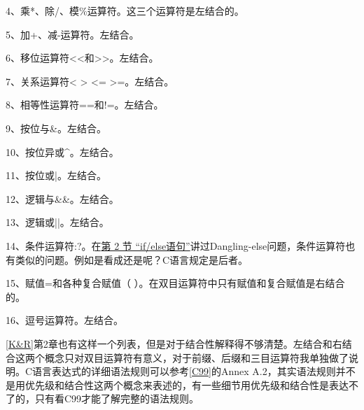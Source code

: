 4、乘*、除/、模\%运算符。这三个运算符是左结合的。



5、加+、减-运算符。左结合。



6、移位运算符\textless{}\textless{}和\textgreater{}\textgreater{}。左结合。



7、关系运算符\textless{} \textgreater{} \textless{}= \textgreater{}=。左结合。



8、相等性运算符==和!=。左结合。



9、按位与\&。左结合。



10、按位异或\textasciicircum{}。左结合。



11、按位或|。左结合。



12、逻辑与\&\&。左结合。



13、逻辑或||。左结合。



14、条件运算符:?。在\hyperlink{db.ch04s02.id2718511}{第 2 节 “if/\BookSplit{}else语句”}讲过Dangling-else问题，条件运算符也有类似的问题。例如是看成还是呢？C语言规定是后者。



15、赋值=和各种复合赋值（\BookCode{*=\BookSplit{}} \BookCode{/\BookSplit{}=\BookSplit{}} \BookCode{\%=\BookSplit{}} \BookCode{+\BookSplit{}=\BookSplit{}} \BookCode{-\BookSplit{}=\BookSplit{}} \BookCode{\textless{}\textless{}=\BookSplit{}} \BookCode{\textgreater{}\textgreater{}=\BookSplit{}} \BookCode{\&=\BookSplit{}} \BookCode{\textasciicircum{}=\BookSplit{}} \BookCode{|\BookSplit{}=\BookSplit{}}）。在双目运算符中只有赋值和复合赋值是右结合的。



16、逗号运算符。左结合。



\hyperlink{db.bi01.bibli.kr}{[K\&R]}第2章也有这样一个列表，但是对于结合性解释得不够清楚。左结合和右结合这两个概念只对双目运算符有意义，对于前缀、后缀和三目运算符我单独做了说明。C语言表达式的详细语法规则可以参考\hyperlink{db.bi01.bibli.c99}{[C99]}的Annex A.\BookSplit{}2，其实语法规则并不是用优先级和结合性这两个概念来表述的，有一些细节用优先级和结合性是表达不了的，只有看C99才能了解完整的语法规则。



